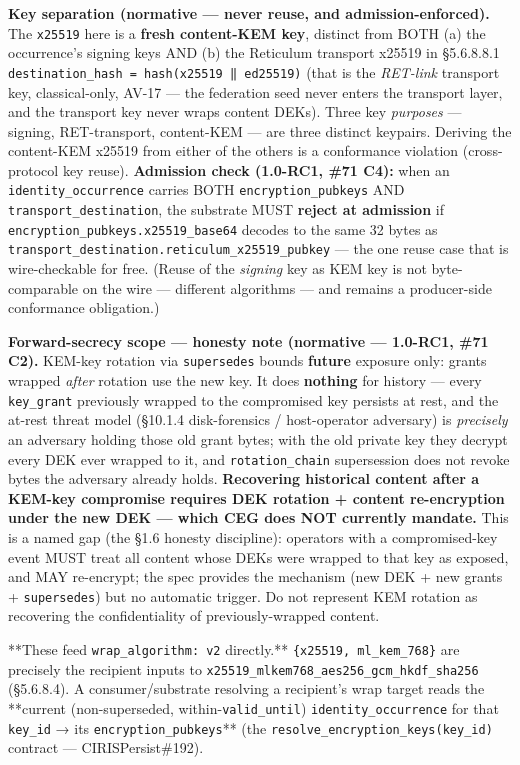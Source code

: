 \documentclass[10pt]{article}
\begin{document}
\textbf{Key separation (normative — never reuse, and admission-enforced).} The \texttt{x25519} here is a \textbf{fresh content-KEM key}, distinct from BOTH (a) the occurrence's signing keys AND (b) the Reticulum transport x25519 in §5.6.8.8.1 \texttt{destination\_hash = hash(x25519 ‖ ed25519)} (that is the \textit{RET-link} transport key, classical-only, AV-17 — the federation seed never enters the transport layer, and the transport key never wraps content DEKs). Three key \textit{purposes} — signing, RET-transport, content-KEM — are three distinct keypairs. Deriving the content-KEM x25519 from either of the others is a conformance violation (cross-protocol key reuse). \textbf{Admission check (1.0-RC1, \#71 C4):} when an \texttt{identity\_occurrence} carries BOTH \texttt{encryption\_pubkeys} AND \texttt{transport\_destination}, the substrate MUST \textbf{reject at admission} if \texttt{encryption\_pubkeys.x25519\_base64} decodes to the same 32 bytes as \texttt{transport\_destination.reticulum\_x25519\_pubkey} — the one reuse case that is wire-checkable for free. (Reuse of the \textit{signing} key as KEM key is not byte-comparable on the wire — different algorithms — and remains a producer-side conformance obligation.)


\textbf{Forward-secrecy scope — honesty note (normative — 1.0-RC1, \#71 C2).} KEM-key rotation via \texttt{supersedes} bounds \textbf{future} exposure only: grants wrapped \textit{after} rotation use the new key. It does \textbf{nothing} for history — every \texttt{key\_grant} previously wrapped to the compromised key persists at rest, and the at-rest threat model (§10.1.4 disk-forensics / host-operator adversary) is \textit{precisely} an adversary holding those old grant bytes; with the old private key they decrypt every DEK ever wrapped to it, and \texttt{rotation\_chain} supersession does not revoke bytes the adversary already holds. \textbf{Recovering historical content after a KEM-key compromise requires DEK rotation + content re-encryption under the new DEK — which CEG does NOT currently mandate.} This is a named gap (the §1.6 honesty discipline): operators with a compromised-key event MUST treat all content whose DEKs were wrapped to that key as exposed, and MAY re-encrypt; the spec provides the mechanism (new DEK + new grants + \texttt{supersedes}) but no automatic trigger. Do not represent KEM rotation as recovering the confidentiality of previously-wrapped content.


**These feed \texttt{wrap\_algorithm: v2} directly.** \texttt{\{x25519, ml\_kem\_768\}} are precisely the recipient inputs to \texttt{x25519\_mlkem768\_aes256\_gcm\_hkdf\_sha256} (§5.6.8.4). A consumer/substrate resolving a recipient's wrap target reads the **current (non-superseded, within-\texttt{valid\_until}) \texttt{identity\_occurrence} for that \texttt{key\_id} → its \texttt{encryption\_pubkeys}** (the \texttt{resolve\_encryption\_keys(key\_id)} contract — CIRISPersist\#192).
\end{document}
